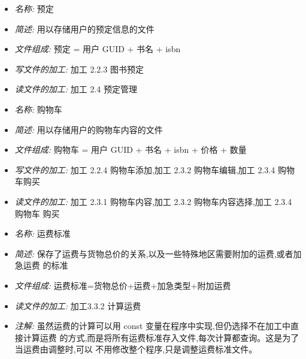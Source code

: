 \documentclass{article}
\begin{document}
\begin{CJK*}{UTF8}{gbsn}
\begin{itemize}
\end{itemize}


\vspace{-1mm}


\begin{itemize}
\item \textit{名称: }预定 
\item \textit{简述: }用以存储用户的预定信息的文件 
\item \textit{文件组成: }预定 = 用户 GUID + 书名 + isbn
\item \textit{写文件的加工: }加工 2.2.3 图书预定 
\item \textit{读文件的加工: }加工 2.4 预定管理

\end{itemize}


\vspace{-1mm}


\begin{itemize}
\item \textit{名称: }购物车
\item \textit{简述: }用以存储用户的购物车内容的文件
\item \textit{文件组成: }购物车 = 用户 GUID + 书名 + isbn + 价格 + 数量
\item \textit{写文件的加工: }加工 2.2.4 购物车添加,加工 2.3.2 购物车编辑,加工 2.3.4 购物车购买 
\item \textit{读文件的加工: }加工 2.3.1 购物车内容,加工 2.3.2 购物车内容选择,加工 2.3.4 购物车 购买

\end{itemize}


\vspace{-1mm}


\begin{itemize}
\item \textit{名称: }运费标准 
\item \textit{简述: }保存了运费与货物总价的关系,以及一些特殊地区需要附加的运费,或者加急运费 的标准
\item \textit{文件组成: }运费标准={货物总价+运费}+{加急类型+附加运费}
\item \textit{读文件的加工: }加工3.3.2 计算运费
\item \textit{注解: }虽然运费的计算可以用 const 变量在程序中实现,但仍选择不在加工中直接计算运费 的方式,而是将所有运费标准存入文件,每次计算都查询。这是为了当运费由调整时,可以 不用修改整个程序,只是调整运费标准文件。

\end{itemize}



\end{CJK*}
\end{document}
